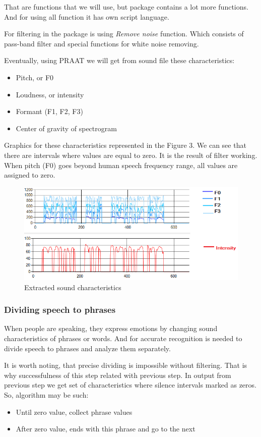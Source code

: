 \documentclass[14pt]{extarticle}
\begin{document}
That are functions that we will use, but package contains a lot more functions. And for using all function it has own script language. 

For filtering in the package is using \textit{Remove noise} function. Which consists of pass-band filter and special functions for white noise removing.

Eventually, using PRAAT we will get from sound file these characteristics:
\begin{itemize}
	\item Pitch, or F0
	\item Loudness, or intensity
	\item Formant (F1, F2, F3)
	\item Center of gravity of spectrogram
\end{itemize}
Graphics for these characteristics represented in the Figure 3. We can see that there are intervals where values are equal to zero. It is the result of filter working. When pitch (F0) goes beyond human speech frequency range, all values are assigned to zero.
\begin{figure}
	\centering
		\includegraphics[scale=0.8]{images/sound-characteristics.png}
	\caption{Extracted sound characteristics}
	\label{fig:sound-characteristics}
\end{figure}

\subsubsection{Dividing speech to phrases}

When people are speaking, they express emotions by changing sound characteristics of phrases or words. And for accurate recognition is needed to divide speech to phrases and analyze them separately.

It is worth noting, that precise dividing is impossible without filtering. That is why successfulness of  this step related with previous step. In output from previous step we get set of characteristics where silence intervals marked as zeros. So, algorithm may be such:
 \begin{itemize}
	 \item Until zero value, collect phrase values
		\item After zero value, ends with this phrase and go to the next
 \end{itemize}
\end{document}
